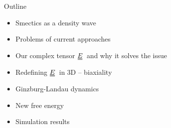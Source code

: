 \documentclass[10pt,mathserif]{beamer}
\newcommand{\duf}[2]{\stackunder[0.5pt]{\stackunder[0.8pt]{\stackunder[1pt]{\ensuremath{#1}}{\rule{\widthof{\ensuremath{#2}}*\real{0.9}}{.1ex}}}{\rule{\widthof{\ensuremath{#2}}*\real{0.9}}{.1ex}}}{}}
\newcommand{\du}[1]{\duf{#1}{#1}}
\newcommand{\EE}{\ensuremath{\du{E}}}
\begin{document}
\begin{frame}[fragile]{Outline}
    \newrefsection
    \begin{itemize}
        \item Smectics as a density wave
        \item Problems of current approaches
        \item Our complex tensor \EE\ and why it solves the issue
    \end{itemize}
    \begin{itemize}
        \item Redefining \EE\ in 3D -- biaxiality
        \item Ginzburg-Landau dynamics
        \item New free energy
    \end{itemize}
    \begin{itemize}
        \item Simulation results
    \end{itemize}
\end{frame}
\end{document}
